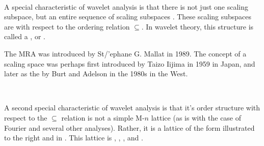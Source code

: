 \mbox{}\\
\begin{minipage}{\tw-55mm}%
  A special characteristic of wavelet analysis is that there is not just one
  scaling subspace,
  but an entire sequence of scaling subspaces .
  These scaling subspaces are  with respect to the
  ordering relation $\subseteq$. In wavelet theory, this structure is called a ,
  or  .

 The MRA was introduced by St{/'e}phane G. Mallat in 1989.
 The concept of a scaling space was perhaps first introduced by Taizo Iijima in 1959 in Japan,
and later as the  by Burt and Adelson in the 1980s in the West.\footnotemark
\end{minipage}%
\hfill%
{\begin{minipage}{50mm}%
  \fns%
\end{minipage}}

\mbox{}\\
\begin{minipage}{\tw-65mm}\label{latwav}%
  A second special characteristic of wavelet analysis is that it's order structure
  with respect to the $\subseteq$ relation is not a simple M-$n$ lattice 
 (as is with the case of Fourier and several other analyses).
  Rather, it is a lattice of the form illustrated to the right and in .
  This lattice is , ,
  , and  .\footnotemark
\end{minipage}%
\hfill%
{\begin{minipage}{60mm}%
\end{minipage}}



